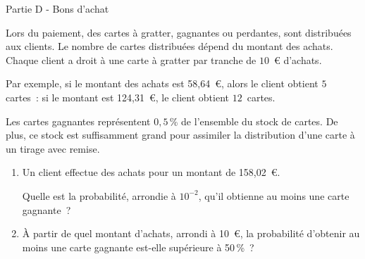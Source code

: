 \bigskip
\begin{center}\begin{h3}Partie D - Bons d'achat \end{h3}\end{center}
\medskip
Lors du paiement, des cartes à gratter, gagnantes ou perdantes, sont distribuées aux clients. Le
nombre de cartes distribuées dépend du montant des achats. Chaque client a droit à une carte à
gratter par tranche de $10$~\euro{} d'achats.
\par
Par exemple, si le montant des achats est 58,64~\euro, alors le client obtient $5$ cartes~: si le montant est
124,31~\euro, le client obtient $12$~cartes.
\par
Les cartes gagnantes représentent $0,5$\,\% de l'ensemble du stock de cartes. De plus, ce stock est
suffisamment grand pour assimiler la distribution d'une carte à un tirage avec remise.
\medskip
\begin{enumerate}
     \item Un client effectue des achats pour un montant de 158,02~\euro.
     \par
     Quelle est la probabilité, arrondie à $10^{-2}$, qu'il obtienne au moins une carte gagnante~?
     \item  À partir de quel montant d'achats, arrondi à 10~\euro, la probabilité d'obtenir au moins une carte
     gagnante est-elle supérieure à 50\,\%~?
\end{enumerate}
